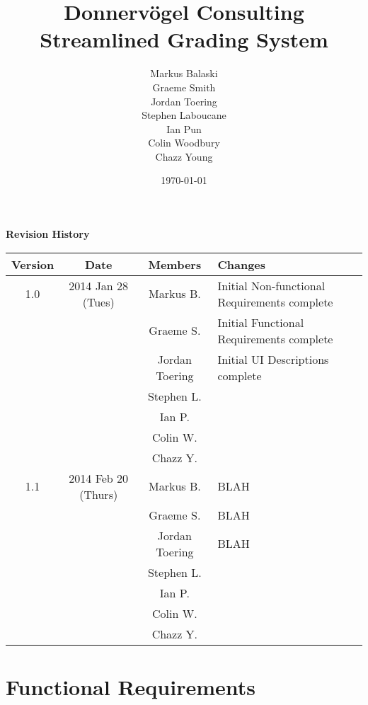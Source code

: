 \documentclass{article}
\begin{document}
\title{Donnervögel Consulting \\ Streamlined Grading System}
\author{Markus Balaski \\ Graeme Smith \\ Jordan Toering \\ Stephen Laboucane \\ Ian Pun \\ Colin Woodbury \\ Chazz Young}
\date{\today}
\maketitle
\clearpage

\textbf{Revision History}
\begin{center}
  \begin{tabular}{| c | c | c | l |}
    \hline
    Version & Date & Members & Changes\\
    \hline
    1.0 & 2014 Jan 28 (Tues) & Markus B. & Initial Non-functional Requirements complete\\
    & & Graeme S. & Initial Functional Requirements complete\\
    & & Jordan Toering & Initial UI Descriptions complete\\
    & & Stephen L. & \\
    & & Ian P. & \\
    & & Colin W. & \\
    & & Chazz Y. & \\
    \hline
    1.1 & 2014 Feb 20 (Thurs) & Markus B. & BLAH\\
    & & Graeme S. & BLAH\\
    & & Jordan Toering & BLAH\\
    & & Stephen L. & \\
    & & Ian P. & \\
    & & Colin W. & \\
    & & Chazz Y. & \\
    \hline
  \end{tabular}
\end{center}
\clearpage

\tableofcontents
\clearpage

\part{Functional Requirements}
\end{document}
